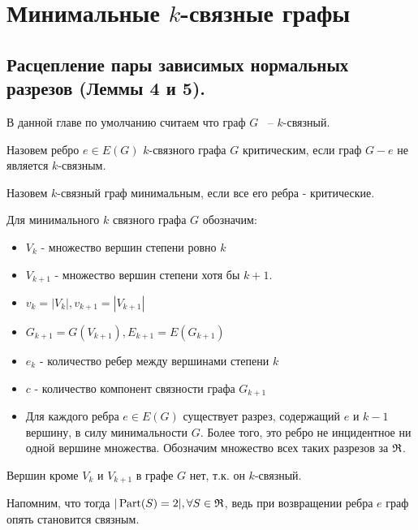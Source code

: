 \newpage

\section{Минимальные $k$-связные графы}

\subsection{Расцепление пары зависимых нормальных разрезов (Леммы 4 и 5).}

В данной главе по умолчанию считаем что граф $G$ ~--  $k$-связный. 

\begin{df*}
	Назовем ребро $e \in E(G)$ $k$-связного графа  $G$ критическим, если граф  $G - e$ не является  $k$-связным.
\end{df*}

\begin{df*}
	Назовем $k$-связный граф минимальным, если все его ребра - критические.
\end{df*}

\begin{prop} \label{prop:for_minimum_k_connected_graph}
	Для минимального $k$ связного графа  $G$ обозначим:
	 \begin{itemize}
		 \item $V_k$ - множество вершин степени ровно  $k$
		 \item  $V_{k +1}$ - множество вершин степени хотя бы  $k + 1$. 
		 \item $v_k = |V_k|, v_{k + 1} = |V_{k + 1}|$
		 \item  $G_{k+1} = G(V_{k + 1}), E_{k + 1} = E(G_{k + 1})$
		\item  $e_k$ - количество ребер между вершинами степени  $k$
		\item $c$ - количество компонент связности графа  $G_{k + 1}$
		\item Для каждого ребра  $e \in E(G)$ существует разрез, содержащий  $e$ и  $k - 1$ вершину, в силу минимальности $G$. Более того, это ребро не инцидентное ни одной вершине множества.
			Обозначим множество всех таких разрезов за  $\mathfrak{R}$.
	\end{itemize}

	Вершин кроме $V_k$ и  $V_{k+1}$ в графе  $G$ нет, т.к. он  $k$-связный.
\end{prop}

Напомним, что тогда $|\operatorname{Part}(S) = 2|, \forall S \in \mathfrak{R}$, ведь при возвращении ребра  $e$ граф опять становится связным.

